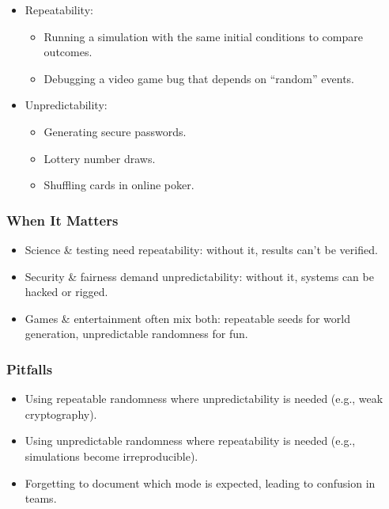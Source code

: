 \documentclass[
  letterpaper,
  DIV=11,
  numbers=noendperiod]{scrreprt}
\providecommand{\tightlist}{%
  \setlength{\itemsep}{0pt}\setlength{\parskip}{0pt}}
\begin{document}
\begin{itemize}
\item
  Repeatability:

  \begin{itemize}
  \tightlist
  \item
    Running a simulation with the same initial conditions to compare
    outcomes.
  \item
    Debugging a video game bug that depends on ``random'' events.
  \end{itemize}
\item
  Unpredictability:

  \begin{itemize}
  \tightlist
  \item
    Generating secure passwords.
  \item
    Lottery number draws.
  \item
    Shuffling cards in online poker.
  \end{itemize}
\end{itemize}

\subsubsection{When It Matters}\label{when-it-matters-24}

\begin{itemize}
\tightlist
\item
  Science \& testing need repeatability: without it, results can't be
  verified.
\item
  Security \& fairness demand unpredictability: without it, systems can
  be hacked or rigged.
\item
  Games \& entertainment often mix both: repeatable seeds for world
  generation, unpredictable randomness for fun.
\end{itemize}

\subsubsection{Pitfalls}\label{pitfalls-23}

\begin{itemize}
\tightlist
\item
  Using repeatable randomness where unpredictability is needed (e.g.,
  weak cryptography).
\item
  Using unpredictable randomness where repeatability is needed (e.g.,
  simulations become irreproducible).
\item
  Forgetting to document which mode is expected, leading to confusion in
  teams.
\end{itemize}
\end{document}
